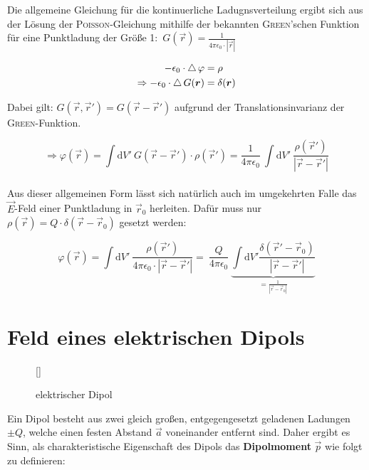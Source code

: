 Die allgemeine Gleichung für die kontinuerliche Ladugnsverteilung ergibt sich aus der Lösung der \textsc{Poisson}-Gleichung mithilfe der bekannten \textsc{Green}'schen Funktion für eine Punktladung der Größe 1:\ $G(\vec{r}) = \frac{1}{4\pi\epsilon_0 \cdot |\vec{r}|}$\

\begin{align*}
-\epsilon_0 \cdot \mathop{{}\bigtriangleup}\nolimits\varphi &= \rho\\
\Rightarrow -\epsilon_0 \cdot \mathop{{}\bigtriangleup}\nolimits G(\bm{r}) &= \delta(\bm{r})\\
\end{align*}

Dabei gilt: $G(\vec{r},\vec{r}') = G(\vec{r}-\vec{r}')$ aufgrund der Translationsinvarianz der \textsc{Green}-Funktion.

\begin{equation*}
\Rightarrow \varphi(\vec{r}) = \int\mathrm{d}V' \ G(\vec{r}-\vec{r}')\cdot\rho(\vec{r}') = \frac{1}{4\pi\epsilon_0} \ \int\mathrm{d}V' \ \frac{\rho(\vec{r}')}{|\vec{r}-\vec{r}'|}
\end{equation*}
\ \\

Aus dieser allgemeinen Form lässt sich natürlich auch im umgekehrten Falle das $\vec{E}$-Feld einer Punktladung in $\vec{r}_0$ herleiten. Dafür muss nur $\rho(\vec{r}) = Q\cdot\delta(\vec{r}-\vec{r}_0)$ gesetzt werden:

\begin{equation*}
\varphi(\vec{r}) = \int\mathrm{d}V' \ \frac{\rho(\vec{r}')}{4\pi\epsilon_0 \cdot |\vec{r}-\vec{r}'|} = \ \frac{Q}{4\pi\epsilon_0} \ \underbrace{\int\mathrm{d}V'\frac{\delta(\vec{r}'-\vec{r}_0)}{|\vec{r}-\vec{r}'|}}_{=\frac{1}{|\vec{r}-\vec{r}_0|}}
\end{equation*}

\section{Feld eines elektrischen Dipols}

\begin{wrapfigure}[17]{r}[0cm]{0cm}
	\raisebox{0pt}[\dimexpr{}\baselineskip\relax]{
		\colorbox{hgrey}{
		}
	}
	\caption{elektrischer Dipol}
\end{wrapfigure}
Ein Dipol besteht aus zwei gleich großen, entgegengesetzt geladenen Ladungen $\pm Q $, welche  einen festen Abstand $\vec{a}$ voneinander entfernt sind. Daher ergibt es Sinn, als charakteristische Eigenschaft des Dipols das \textbf{Dipolmoment} $\vec{p}$ wie folgt zu definieren:


